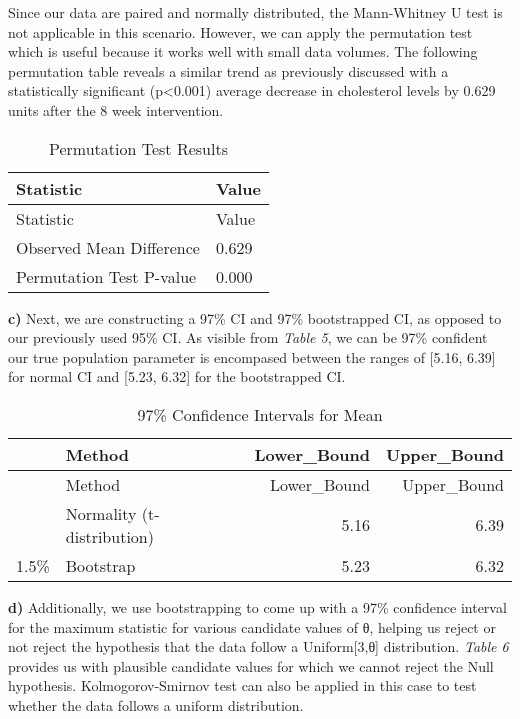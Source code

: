 \documentclass[
]{article}
\begin{document}
Since our data are paired and normally distributed, the Mann-Whitney U
test is not applicable in this scenario. However, we can apply the
permutation test which is useful because it works well with small data
volumes. The following permutation table reveals a similar trend as
previously discussed with a statistically significant (p\textless0.001)
average decrease in cholesterol levels by 0.629 units after the 8 week
intervention.

\begin{longtable}[]{@{}ll@{}}
\caption{Permutation Test Results}\tabularnewline
\toprule\noalign{}
Statistic & Value \\
\midrule\noalign{}
\endfirsthead
\toprule\noalign{}
Statistic & Value \\
\midrule\noalign{}
\endhead
\bottomrule\noalign{}
\endlastfoot
Observed Mean Difference & 0.629 \\
Permutation Test P-value & 0.000 \\
\end{longtable}

\textbf{c)} Next, we are constructing a 97\% CI and 97\% bootstrapped
CI, as opposed to our previously used 95\% CI. As visible from
\emph{Table 5}, we can be 97\% confident our true population parameter
is encompased between the ranges of {[}5.16, 6.39{]} for normal CI and
{[}5.23, 6.32{]} for the bootstrapped CI.

\begin{longtable}[]{@{}llrr@{}}
\caption{97\% Confidence Intervals for Mean}\tabularnewline
\toprule\noalign{}
& Method & Lower\_Bound & Upper\_Bound \\
\midrule\noalign{}
\endfirsthead
\toprule\noalign{}
& Method & Lower\_Bound & Upper\_Bound \\
\midrule\noalign{}
\endhead
\bottomrule\noalign{}
\endlastfoot
& Normality (t-distribution) & 5.16 & 6.39 \\
1.5\% & Bootstrap & 5.23 & 6.32 \\
\end{longtable}

\textbf{d)} Additionally, we use bootstrapping to come up with a 97\%
confidence interval for the maximum statistic for various candidate
values of θ, helping us reject or not reject the hypothesis that the
data follow a Uniform{[}3,θ{]} distribution. \emph{Table 6} provides us
with plausible candidate values for which we cannot reject the Null
hypothesis. Kolmogorov-Smirnov test can also be applied in this case to
test whether the data follows a uniform distribution.
\end{document}
